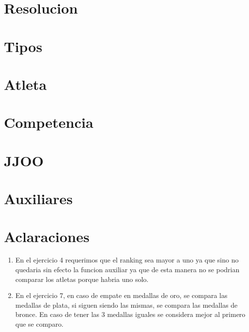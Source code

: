 \documentclass[10pt,titlepage,a4paper]{article}
\begin{document}
\maketitle

\newpage

\section{Resolucion}

\begin{enumerate}






\end{enumerate}


\newpage

\section{Tipos}



\section{Atleta}


\section{Competencia}



\section{JJOO}


\section{Auxiliares}



\section{Aclaraciones}

\begin{enumerate}
\item
En el ejercicio 4 requerimos que el ranking sea mayor a uno ya que 
sino no quedaria sin efecto la funcion auxiliar ya que de esta manera 
no se podrian comparar los atletas porque habria uno solo.

\item
En el ejercicio 7, en caso de empate en medallas de oro, se compara las medallas de plata, si siguen siendo las mismas, se compara las medallas de bronce. En caso de tener las 3 medallas iguales se considera mejor al primero que se comparo.
\end{enumerate}
\end{document}
